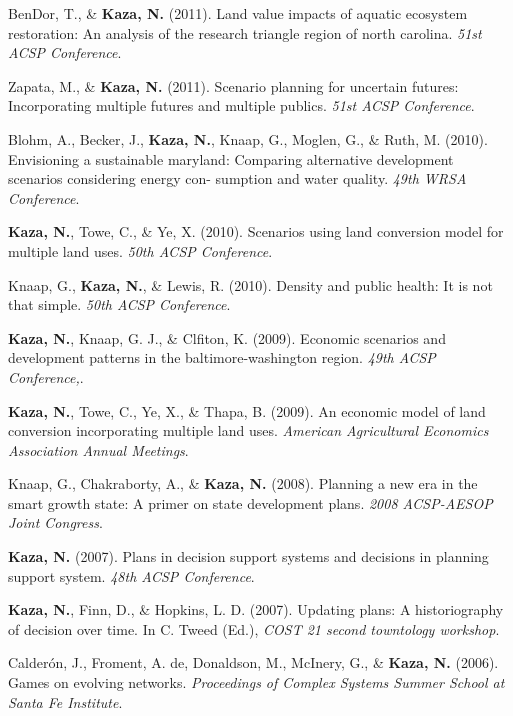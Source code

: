 \documentclass[11pt,a4paper,]{awesome-cv}
\newlength{\cslhangindent}
\newenvironment{CSLReferences}[2] %
 {\begin{list}{}{%
  \setlength{\itemindent}{0pt}
  \setlength{\leftmargin}{0pt}
  \setlength{\parsep}{0pt}
  \ifodd #1
   \setlength{\leftmargin}{\cslhangindent}
   \setlength{\itemindent}{-1\cslhangindent}
  \fi
  \setlength{\itemsep}{#2\baselineskip}}}
 {\end{list}}
\begin{document}
\begin{CSLReferences}{1}{0}
BenDor, T., \& \textbf{Kaza, N.} (2011). Land value impacts of aquatic
ecosystem restoration: An analysis of the research triangle region of
north carolina. \emph{51st ACSP Conference}.

Zapata, M., \& \textbf{Kaza, N.} (2011). Scenario planning for uncertain
futures: Incorporating multiple futures and multiple publics. \emph{51st
ACSP Conference}.

Blohm, A., Becker, J., \textbf{Kaza, N.}, Knaap, G., Moglen, G., \&
Ruth, M. (2010). Envisioning a sustainable maryland: Comparing
alternative development scenarios considering energy con- sumption and
water quality. \emph{49th WRSA Conference}.

\textbf{Kaza, N.}, Towe, C., \& Ye, X. (2010). Scenarios using land
conversion model for multiple land uses. \emph{50th ACSP Conference}.

Knaap, G., \textbf{Kaza, N.}, \& Lewis, R. (2010). Density and public
health: It is not that simple. \emph{50th ACSP Conference}.

\textbf{Kaza, N.}, Knaap, G. J., \& Clfiton, K. (2009). Economic
scenarios and development patterns in the baltimore-washington region.
\emph{49th ACSP Conference,}.

\textbf{Kaza, N.}, Towe, C., Ye, X., \& Thapa, B. (2009). An economic
model of land conversion incorporating multiple land uses.
\emph{American Agricultural Economics Association Annual Meetings}.

Knaap, G., Chakraborty, A., \& \textbf{Kaza, N.} (2008). Planning a new
era in the smart growth state: A primer on state development plans.
\emph{2008 ACSP-AESOP Joint Congress}.

\textbf{Kaza, N.} (2007). Plans in decision support systems and
decisions in planning support system. \emph{48th ACSP Conference}.

\textbf{Kaza, N.}, Finn, D., \& Hopkins, L. D. (2007). Updating plans: A
historiography of decision over time. In C. Tweed (Ed.), \emph{COST 21
second towntology workshop}.

Calderón, J., Froment, A. de, Donaldson, M., McInery, G., \&
\textbf{Kaza, N.} (2006). Games on evolving networks. \emph{Proceedings
of Complex Systems Summer School at Santa Fe Institute}.


\end{CSLReferences}
\end{document}
